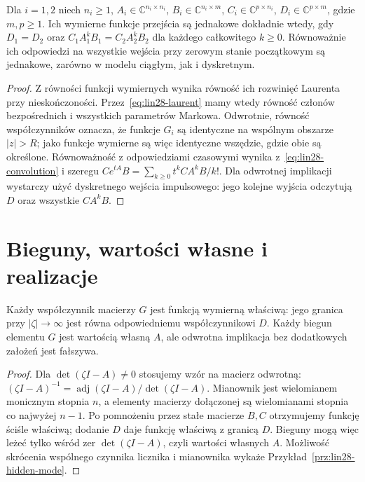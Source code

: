 \begin{wniosek}
\label{cor:lin28-markov}
Dla \(i=1,2\) niech \(n_i\ge1\),
\(A_i\in\mathbb C^{n_i\times n_i}\),
\(B_i\in\mathbb C^{n_i\times m}\),
\(C_i\in\mathbb C^{p\times n_i}\),
\(D_i\in\mathbb C^{p\times m}\), gdzie \(m,p\ge1\).
Ich wymierne funkcje przejścia są jednakowe
dokładnie wtedy, gdy \(D_1=D_2\) oraz
\(C_1A_1^kB_1=C_2A_2^kB_2\)
dla każdego całkowitego \(k\ge0\).
Równoważnie ich odpowiedzi na wszystkie
wejścia przy zerowym stanie początkowym
są jednakowe, zarówno w modelu ciągłym,
jak i dyskretnym.
\end{wniosek}
\begin{proof}
Z równości funkcji wymiernych wynika równość
ich rozwinięć Laurenta przy nieskończoności.
Przez~\eqref{eq:lin28-laurent} mamy wtedy
równość członów bezpośrednich i wszystkich
parametrów Markowa. Odwrotnie, równość
współczynników oznacza, że funkcje \(G_i\)
są identyczne na wspólnym obszarze \(|z|>R\);
jako funkcje wymierne są więc identyczne
wszędzie, gdzie obie są określone.
Równoważność z odpowiedziami czasowymi
wynika z~\eqref{eq:lin28-convolution}
i szeregu \(Ce^{tA}B=\sum_{k\ge0}t^kCA^kB/k!\).
Dla odwrotnej implikacji wystarczy
użyć dyskretnego wejścia impulsowego:
jego kolejne wyjścia odczytują \(D\)
oraz wszystkie \(CA^kB\).
\end{proof}

\section{Bieguny, wartości własne i realizacje}
\label{sec:lin28-poles}

\begin{stwierdzenie}
\label{prop:lin28-rational}
Każdy współczynnik macierzy \(G\)
jest funkcją wymierną właściwą:
jego granica przy \(|\zeta|\to\infty\)
jest równa odpowiedniemu współczynnikowi \(D\).
Każdy biegun elementu \(G\) jest
wartością własną \(A\), ale odwrotna
implikacja bez dodatkowych założeń jest fałszywa.
\end{stwierdzenie}
\begin{proof}
Dla \(\det(\zeta I-A)\ne0\) stosujemy
wzór na macierz odwrotną:
\((\zeta I-A)^{-1}
 =\operatorname{adj}(\zeta I-A)/
  \det(\zeta I-A)\).
Mianownik jest wielomianem monicznym
stopnia \(n\), a elementy macierzy dołączonej
są wielomianami stopnia co najwyżej \(n-1\).
Po pomnożeniu przez stałe macierze \(B,C\)
otrzymujemy funkcję ściśle właściwą;
dodanie \(D\) daje funkcję właściwą
z granicą \(D\). Bieguny mogą więc leżeć
tylko wśród zer \(\det(\zeta I-A)\),
czyli wartości własnych \(A\).
Możliwość skrócenia wspólnego czynnika
licznika i mianownika wykaże
Przykład~\ref{prz:lin28-hidden-mode}.
\end{proof}

